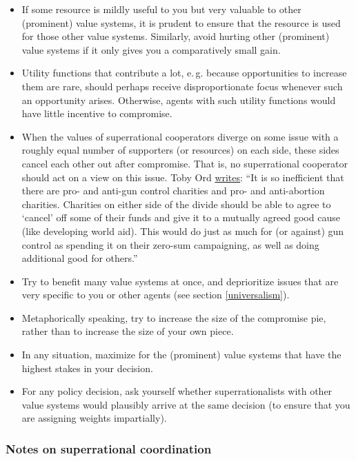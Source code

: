 \begin{itemize}
\item
  If some resource is mildly useful to you but very valuable to other
  (prominent) value systems, it is prudent to ensure that the resource
  is used for those other value systems. Similarly, avoid hurting other
  (prominent) value systems if it only gives you a comparatively small
  gain.
\item
  Utility functions that contribute a lot, e.\,g. because opportunities to
  increase them are rare, should perhaps receive disproportionate focus
  whenever such an opportunity arises. Otherwise, agents with such
  utility functions would have little incentive to compromise.
\item
  When the values of superrational cooperators diverge on some issue
  with a roughly equal number of supporters (or resources) on each side,
  these sides cancel each other out after compromise. That is, no
  superrational cooperator should act on a view on this issue. Toby Ord
  \href{http://felicifia.org/viewtopic.php?t=79\#p486}{writes}:
  ``It is so inefficient that there are pro- and anti-gun control
  charities and pro- and anti-abortion charities. Charities on either
  side of the divide should be able to agree to `cancel' off some of
  their funds and give it to a mutually agreed good cause (like
  developing world aid). This would do just as much for (or against) gun
  control as spending it on their zero-sum campaigning, as well as doing
  additional good for others.''
\item
  Try to benefit many value systems at once, and deprioritize issues
  that are very specific to you or other agents (see section
  \ref{universalism}).
\item
  Metaphorically speaking, try to increase the size of the compromise
  pie, rather than to increase the size of your own piece.
\item
  In any situation, maximize for the (prominent) value systems that have
  the highest stakes in your decision.
\item
  For any policy decision, ask yourself whether superrationalists with
  other value systems would plausibly arrive at the same decision (to
  ensure that you are assigning weights impartially).
\end{itemize}

\hypertarget{notes-on-superrational-coordination}{\subsubsection{Notes
on superrational
coordination}\label{notes-on-superrational-coordination}}

